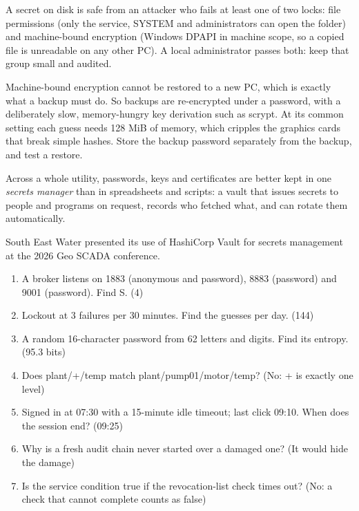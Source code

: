  A secret on disk is safe from an attacker who fails at least one of two locks: file permissions (only the service, SYSTEM and administrators can open the folder) and machine-bound encryption (Windows DPAPI in machine scope, so a copied file is unreadable on any other PC). A local administrator passes both: keep that group small and audited.

Machine-bound encryption cannot be restored to a new PC, which is exactly what a backup must do. So backups are re-encrypted under a password, with a deliberately slow, memory-hungry key derivation such as scrypt. At its common setting each guess needs 128 MiB of memory, which cripples the graphics cards that break simple hashes. Store the backup password separately from the backup, and test a restore.

Across a whole utility, passwords, keys and certificates are better kept in one \emph{secrets manager} than in spreadsheets and scripts: a vault that issues secrets to people and programs on request, records who fetched what, and can rotate them automatically.

 South East Water presented its use of HashiCorp Vault for secrets management at the 2026 Geo SCADA conference.


\begin{enumerate}
\item A broker listens on 1883 (anonymous and password), 8883 (password) and 9001 (password). Find S. (4)
\item Lockout at 3 failures per 30 minutes. Find the guesses per day. (144)
\item A random 16-character password from 62 letters and digits. Find its entropy. (95.3 bits)
\item Does plant/+/temp match plant/pump01/motor/temp? (No: + is exactly one level)
\item Signed in at 07:30 with a 15-minute idle timeout; last click 09:10. When does the session end? (09:25)
\item Why is a fresh audit chain never started over a damaged one? (It would hide the damage)
\item Is the service condition true if the revocation-list check times out? (No: a check that cannot complete counts as false)
\end{enumerate}
